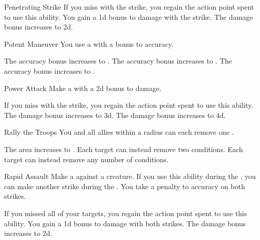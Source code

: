 {\begin{ability}{Penetrating Strike}
                \rankline
                 If you miss with the strike, you regain the action point spent to use this ability.
                 You gain a \plus1d bonus to damage with the strike.
                 The damage bonus increases to \plus2d.
            \end{ability}

            \begin{ability}{Potent Maneuver}
                You use a  with a  bonus to accuracy.

                \rankline
                 The accuracy bonus increases to .
                 The accuracy bonus increases to .
                 The accuracy bonus increases to .
            \end{ability}

            \begin{ability}{Power Attack}
                Make a  with a \plus2d bonus to damage.

                \rankline
                 If you miss with the strike, you regain the action point spent to use this ability.
                 The damage bonus increases to \plus3d.
                 The damage bonus increases to \plus4d.
            \end{ability}

            \begin{ability}{Rally the Troops}
                You and all allies within a \areamed radius can each remove one .

                \rankline
                 The area increases to \arealarge.
                 Each target can instead remove two conditions.
                 Each target can instead remove any number of conditions.
            \end{ability}

            \begin{ability}{Rapid Assault}
                Make a  against a creature.
                If you use this ability during the , you can make another strike during the .
                You take a  penalty to accuracy on both strikes.

                \rankline
                 If you missed all of your targets, you regain the action point spent to use this ability.
                 You gain a \plus1d bonus to damage with both strikes.
                 The damage bonus increases to \plus2d.
            \end{ability}

}
